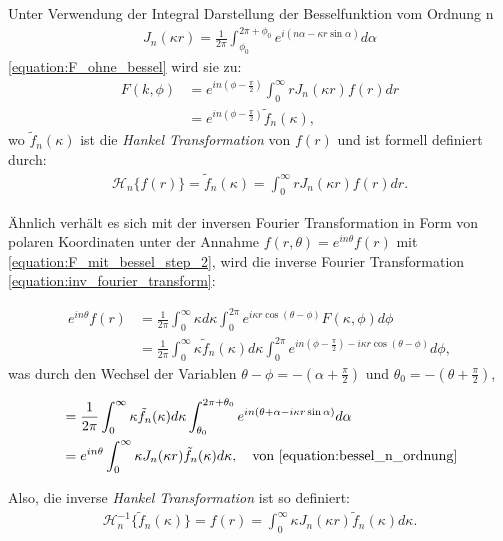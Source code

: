 Unter Verwendung der Integral Darstellung der Besselfunktion vom Ordnung n 
\begin{align}
	J_n(\kappa r)=\frac{1}{2\pi}\int_{\phi_{0}}^{2\pi + \phi_{0}}e^{i(n\alpha-\kappa r \sin \alpha)} d\alpha
	\label{equation:bessel_n_ordnung}
\end{align}
\eqref{equation:F_ohne_bessel} wird sie zu:
\begin{align}
	F(k,\phi)&=e^{in(\phi-\frac{\pi}{2})}\int_{0}^{\infty}rJ_n(\kappa r) f(r) dr \label{equation:F_mit_bessel_step_1} \\
	&=e^{in(\phi-\frac{\pi}{2})}\tilde{f}_n(\kappa),
	\label{equation:F_mit_bessel_step_2}
\end{align}
wo $\tilde{f}_n(\kappa)$ ist die \textit{Hankel Transformation} von $f(r)$ und ist formell definiert durch:
\begin{align}
	\mathscr{H}_n\{f(r)\}=\tilde{f}_n(\kappa)=\int_{0}^{\infty}rJ_n(\kappa r) f(r) dr.
	\label{equation:hankel}
\end{align}

Ähnlich verhält es sich mit der inversen Fourier Transformation in Form von polaren Koordinaten unter der Annahme $f(r,\theta)=e^{in\theta}f(r)$ mit \ref{equation:F_mit_bessel_step_2}, wird die inverse Fourier Transformation \ref{equation:inv_fourier_transform}:

\begin{align*}
	e^{in\theta}f(r)&=\frac{1}{2\pi}\int_{0}^{\infty}\kappa d\kappa \int_{0}^{2\pi}e^{i\kappa r \cos (\theta - \phi)}F(\kappa,\phi) d\phi\\
	&= \frac{1}{2\pi}\int_{0}^{\infty}\kappa \tilde{f}_n(\kappa) d\kappa \int_{0}^{2\pi}e^{in(\phi - \frac{\pi}{2})- i\kappa r \cos (\theta - \phi)} d\phi,
\end{align*}
was durch den Wechsel der Variablen $\theta-\phi=-(\alpha+\frac{\pi}{2})$ und $\theta_0=-(\theta+\frac{\pi}{2})$,

\begin{align}
	&= \frac{1}{2\pi}\int_{0}^{\infty}\kappa \tilde{f}_n(\kappa) d\kappa \int_{\theta_0}^{2\pi+\theta_0}e^{in(\theta + \alpha - i\kappa r \sin\alpha)} d\alpha \nonumber \\
	&= e^{in\theta}\int_{0}^{\infty}\kappa J_n(\kappa r) \tilde{f}_n(\kappa) d\kappa,\quad \text{von \eqref{equation:bessel_n_ordnung}}
\end{align}

Also, die inverse \textit{Hankel Transformation} ist so definiert:
\begin{align}
	\mathscr{H}^{-1}_n\{\tilde{f}_n(\kappa)\}=f(r)=\int_{0}^{\infty}\kappa J_n(\kappa r) \tilde{f}_n(\kappa) d\kappa.
	\label{equation:inv_hankel}
\end{align}

